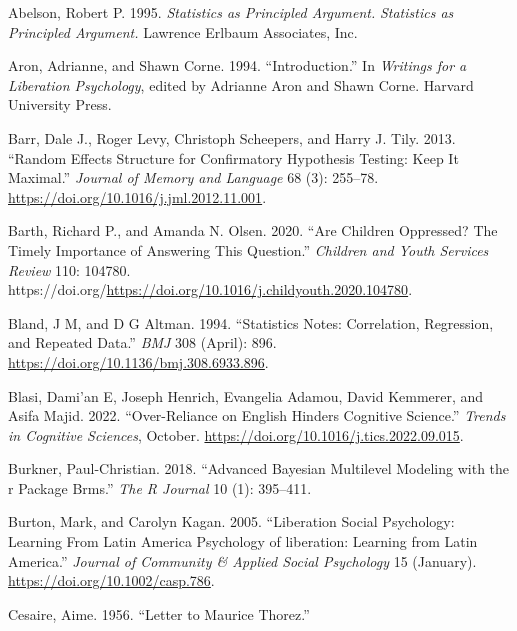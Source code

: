 \documentclass[
  letterpaper,
  DIV=11,
  numbers=noendperiod]{scrreprt}
\newlength{\cslhangindent}
\newlength{\cslentryspacingunit} %
\newenvironment{CSLReferences}[2] %
 {%
  \setlength{\parindent}{0pt}
  \ifodd #1
  \let\oldpar\par
  \def\par{\hangindent=\cslhangindent\oldpar}
  \fi
  \setlength{\parskip}{#2\cslentryspacingunit}
 }%
 {}
\begin{document}
\hypertarget{refs}{}
\begin{CSLReferences}{1}{0}
\leavevmode{}%
Abelson, Robert P. 1995. \emph{Statistics as Principled Argument.}
\emph{Statistics as Principled Argument.} Lawrence Erlbaum Associates,
Inc.

\leavevmode{}%
Aron, Adrianne, and Shawn Corne. 1994. {``Introduction.''} In
\emph{Writings for a Liberation Psychology}, edited by Adrianne Aron and
Shawn Corne. Harvard University Press.

\leavevmode{}%
Barr, Dale J., Roger Levy, Christoph Scheepers, and Harry J. Tily. 2013.
{``Random Effects Structure for Confirmatory Hypothesis Testing: Keep It
Maximal.''} \emph{Journal of Memory and Language} 68 (3): 255--78.
\url{https://doi.org/10.1016/j.jml.2012.11.001}.

\leavevmode{}%
Barth, Richard P., and Amanda N. Olsen. 2020. {``Are Children Oppressed?
The Timely Importance of Answering This Question.''} \emph{Children and
Youth Services Review} 110: 104780.
https://doi.org/\url{https://doi.org/10.1016/j.childyouth.2020.104780}.

\leavevmode{}%
Bland, J M, and D G Altman. 1994. {``Statistics Notes: Correlation,
Regression, and Repeated Data.''} \emph{BMJ} 308 (April): 896.
\url{https://doi.org/10.1136/bmj.308.6933.896}.

\leavevmode{}%
Blasi, Dami'an E, Joseph Henrich, Evangelia Adamou, David Kemmerer, and
Asifa Majid. 2022. {``Over-Reliance on {E}nglish Hinders Cognitive
Science.''} \emph{Trends in Cognitive Sciences}, October.
\url{https://doi.org/10.1016/j.tics.2022.09.015}.

\leavevmode{}%
Burkner, Paul-Christian. 2018. {``Advanced {B}ayesian Multilevel
Modeling with the r Package Brms.''} \emph{The R Journal} 10 (1):
395--411.

\leavevmode{}%
Burton, Mark, and Carolyn Kagan. 2005. {``{Liberation Social Psychology:
Learning From Latin America Psychology of liberation: Learning from
Latin America}.''} \emph{Journal of Community \& Applied Social
Psychology} 15 (January). \url{https://doi.org/10.1002/casp.786}.

\leavevmode{}%
Cesaire, Aime. 1956. {``Letter to {M}aurice {T}horez.''}


\end{CSLReferences}
\end{document}
